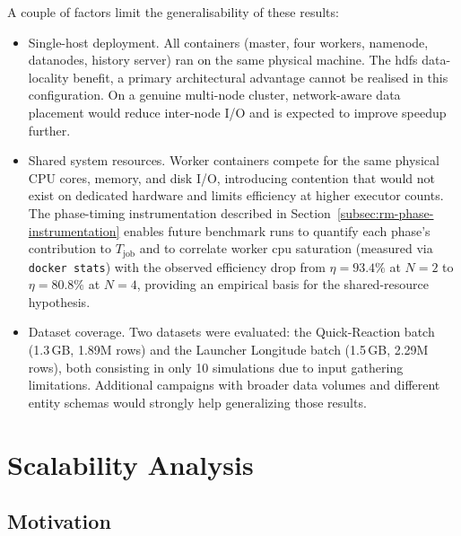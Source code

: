 A couple of factors limit the generalisability of these results:

\begin{itemize}
    \item Single-host deployment.  All containers (master, four workers,
          namenode, datanodes, history server) ran on the same physical machine.
          The \gls{hdfs} data-locality benefit, a primary architectural advantage  
          cannot be realised in this configuration.  On a genuine multi-node cluster,
          network-aware data placement would reduce inter-node I/O and is expected to
          improve speedup further.
    \item Shared system resources.  Worker containers compete for the same
          physical CPU cores, memory, and disk I/O, introducing contention that would
          not exist on dedicated hardware and limits efficiency at higher executor counts.
          The phase-timing instrumentation described in
          Section~\ref{subsec:rm-phase-instrumentation} enables future benchmark runs to
          quantify each phase's contribution to $T_{\text{job}}$ and to correlate
          worker \gls{cpu} saturation (measured via \texttt{docker stats}) with the
          observed efficiency drop from $\eta=93.4\%$ at $N=2$ to $\eta=80.8\%$ at $N=4$,
          providing an empirical basis for the shared-resource hypothesis.
    \item Dataset coverage.  Two datasets were evaluated: the Quick-Reaction
          batch (1.3\,GB, 1.89M rows) and the Launcher Longitude batch (1.5\,GB, 2.29M
          rows), both consisting in only 10 simulations due to input gathering limitations.
          Additional campaigns with broader data volumes and different entity schemas would
          strongly help generalizing those results.
\end{itemize}

\section{Scalability Analysis}
\label{sec:eval-scalability}

\subsection{Motivation}
\label{subsec:eval-scalability-motivation}

